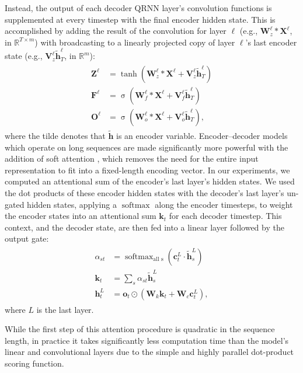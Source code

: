 \documentclass{article} \usepackage{iclr2017_conference,times}
\DeclareMathOperator*{\softmax}{softmax}
\DeclareMathOperator*{\sigmoid}{\sigma}
\begin{document}
Instead, the output of each decoder QRNN layer's convolution functions is supplemented at every timestep with the final encoder hidden state. This is accomplished by adding the result of the convolution for layer $\ell$ (e.g., $\mathbf{W}_z^\ell*\mathbf{X}^\ell$, in $\mathbb{R}^{T\times m}$) with broadcasting to a linearly projected copy of layer $\ell$'s last encoder state (e.g., $\mathbf{V}_z^\ell\mathbf{\tilde{h}}_T^\ell$, in $\mathbb{R}^m$):
\begin{align}
\begin{split}\label{decoder-conv}
\mathbf{Z}^\ell&=\tanh(\mathbf{W}_z^\ell*\mathbf{X}^\ell+\mathbf{V}_z^\ell\mathbf{\tilde{h}}^\ell_T)\\
\mathbf{F}^\ell&=\sigmoid(\mathbf{W}_f^\ell*\mathbf{X}^\ell+\mathbf{V}_f^\ell\mathbf{\tilde{h}}^\ell_T)\\
\mathbf{O}^\ell&=\sigmoid(\mathbf{W}_o^\ell*\mathbf{X}^\ell+\mathbf{V}_o^\ell\mathbf{\tilde{h}}^\ell_T),
\end{split}
\end{align}
where the tilde denotes that $\mathbf{\tilde{h}}$ is an encoder variable.
Encoder--decoder models which operate on long sequences are made significantly more powerful with the addition of soft attention \citep{Bahdanau2015}, which removes the need for the entire input representation to fit into a fixed-length encoding vector. In our experiments, we computed an attentional sum of the encoder's last layer's hidden states. We used the dot products of these encoder hidden states with the decoder's last layer's un-gated hidden states, applying a $\softmax$ along the encoder timesteps, to weight the encoder states into an attentional sum $\mathbf{k}_t$ for each decoder timestep.
This context, and the decoder state, are then fed into a linear layer followed by the output gate:
\begin{align}
\begin{split}\label{attn}
\alpha_{st}&=\softmax_\text{all s}(\mathbf{c}^L_t\cdot\mathbf{\tilde{h}}^L_s)\\
\mathbf{k}_t&=\sum_s\alpha_{st}\mathbf{\tilde{h}}^L_s\\
\mathbf{h}^L_t&=\mathbf{o}_t\odot(\mathbf{W}_k\mathbf{k}_t+\mathbf{W}_c \mathbf{c}^L_t),
\end{split}
\end{align}
where $L$ is the last layer.

While the first step of this attention procedure is quadratic in the sequence length, in practice it takes significantly less computation time than the model's linear and convolutional layers due to the simple and highly parallel dot-product scoring function.
\end{document}
